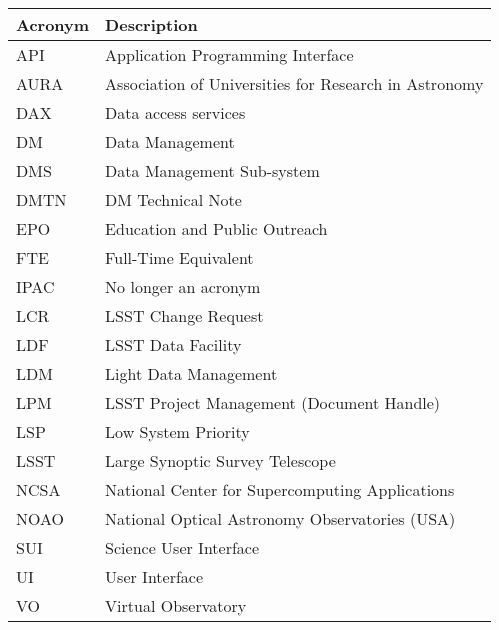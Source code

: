 \addtocounter{table}{-1}
\begin{longtable}{|l|p{}|}\hline
\textbf{Acronym} & \textbf{Description}  \\\hline

API & Application Programming Interface \\\hline
AURA & Association of Universities for Research in Astronomy \\\hline
DAX & Data access services \\\hline
DM & Data Management \\\hline
DMS & Data Management Sub-system \\\hline
DMTN & DM Technical Note \\\hline
EPO & Education and Public Outreach \\\hline
FTE & Full-Time Equivalent \\\hline
IPAC & No longer an acronym \\\hline
LCR & LSST Change Request \\\hline
LDF & LSST Data Facility \\\hline
LDM & Light Data Management \\\hline
LPM & LSST Project Management (Document Handle) \\\hline
LSP & Low System Priority \\\hline
LSST & Large Synoptic Survey Telescope \\\hline
NCSA & National Center for Supercomputing Applications \\\hline
NOAO & National Optical Astronomy Observatories (USA) \\\hline
SUI & Science User Interface \\\hline
UI & User Interface \\\hline
VO & Virtual Observatory \\\hline
\end{longtable}
